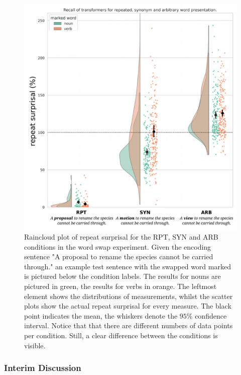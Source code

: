 \begin{figure}
    \centering
    \includegraphics[width=\textwidth]{experiments/word_swap_plot.pdf}
    \caption{Raincloud plot of repeat surprisal for the RPT, SYN and ARB conditions in the word swap experiment. Given the encoding sentence "A proposal to rename the species cannot be carried through." an example test sentence with the swapped word marked is pictured below the condition labels. The results for nouns are pictured in green, the results for verbs in orange. The leftmost element shows the distributions of measurements, whilst the scatter plots show the actual repeat surprisal for every measure. The black point indicates the mean, the whiskers denote the $95\%$ confidence interval. Notice that that there are different numbers of data points per condition. Still, a clear difference between the conditions is visible.}
    \label{fig:word_swap_experiment}
\end{figure}

\subsubsection{Interim Discussion}

